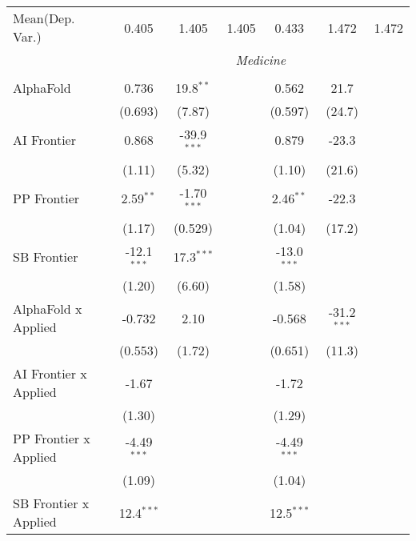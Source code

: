 \begin{tabular}{lcccccc}
Mean(Dep. Var.) & 0.405 & 1.405 & 1.405 & 0.433 & 1.472 & 1.472 \\
 & \multicolumn{6}{c}{\textit{Medicine}} \\ \\
   AlphaFold                    & 0.736         & 19.8$^{**}$   &                & 0.562         & 21.7          &   \\   
                                & (0.693)       & (7.87)        &                & (0.597)       & (24.7)        &   \\   
   AI Frontier                  & 0.868         & -39.9$^{***}$ &                & 0.879         & -23.3         &   \\   
                                & (1.11)        & (5.32)        &                & (1.10)        & (21.6)        &   \\   
   PP Frontier                  & 2.59$^{**}$   & -1.70$^{***}$ &                & 2.46$^{**}$   & -22.3         &   \\   
                                & (1.17)        & (0.529)       &                & (1.04)        & (17.2)        &   \\   
   SB Frontier                  & -12.1$^{***}$ & 17.3$^{***}$  &                & -13.0$^{***}$ &               &   \\   
                                & (1.20)        & (6.60)        &                & (1.58)        &               &   \\   
   AlphaFold x Applied          & -0.732        & 2.10          &                & -0.568        & -31.2$^{***}$ &   \\   
                                & (0.553)       & (1.72)        &                & (0.651)       & (11.3)        &   \\   
   AI Frontier x Applied        & -1.67         &               &                & -1.72         &               &   \\   
                                & (1.30)        &               &                & (1.29)        &               &   \\   
   PP Frontier x Applied        & -4.49$^{***}$ &               &                & -4.49$^{***}$ &               &   \\   
                                & (1.09)        &               &                & (1.04)        &               &   \\   
   SB Frontier x Applied        & 12.4$^{***}$  &               &                & 12.5$^{***}$  &               &   \\   

\end{tabular}

